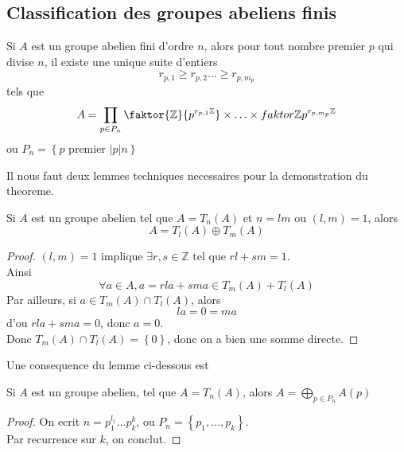 \documentclass[../main.tex]{subfiles}
\begin{document}
\subsection{Classification des groupes abeliens finis}
\begin{thm}[Classifiaction]
	Si $A$ est un groupe abelien fini d'ordre $n$, alors pour tout nombre premier $p$ qui divise $n$, il existe une unique suite d'entiers
	\[ 
	r_{p,1} \geq r_{p,2} \ldots \geq r_{p,m_p} 
	\]
	tels que
	\[ 
	A= \prod_{p\in P_n} \faktor{\mathbb{Z}}{p^{r_{p,1} \mathbb{Z}} } \times \ldots \times faktor{\mathbb{Z}}{p^{r_{p,m_p} \mathbb{Z}} }
	\]
ou $P_n = \left\{ p \text{ premier } \vert p|n \right\} $ 	
	
\end{thm}
Il nous faut deux lemmes techniques necessaires pour la demonstration du theoreme.
\begin{lemma}
Si $A$ est un groupe abelien tel que $A= T_n( A) $ et $n=lm$  ou $( l,m) =1$, alors
\[ 
A = T_l( A) \oplus T_m( A) 
\]

\end{lemma}
\begin{proof}
$( l,m) =1$ implique $\exists r,s \in \mathbb{Z} \text{ tel que } rl + sm =1$.\\
Ainsi
\[ 
\forall a \in A, a = rla + sma \in T_m( A) + T_l( A) 
\]
Par ailleurs, si $a\in T_m( A) \cap T_l( A) $, alors
\[ 
la = 0 = ma
\]
d'ou $rla+ sma = 0$, donc $a=0$.\\
Donc $T_m( A) \cap T_l( A) = \left\{ 0 \right\} $, donc on a bien une somme directe.
\end{proof}
Une consequence du lemme ci-dessous est
\begin{lemma}
Si $A$ est un groupe abelien, tel que $A= T_n( A) $, alors $A= \bigoplus_{p \in P_n} A( p) $ 
\end{lemma}
\begin{proof}
On ecrit $n = p_1^{l_1}\ldots p_k^{k}$, ou $P_n = \left\{ p_1, \ldots, p_k \right\} $.\\
Par recurrence sur $k$, on conclut.
\end{proof}
\end{document}
